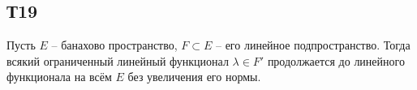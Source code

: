 


\subsection*{Т19}



\begin{to_thr}
    Пусть $E$ -- банахово пространство, $F \subset E$ -- его линейное подпространство. Тогда всякий ограниченный линейный функционал $\lambda \in F'$ продолжается до линейного функционала на всём $E$ без увеличения его нормы.
\end{to_thr}



